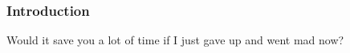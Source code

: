 \begin{frame}
  \frametitle{Introduction}
  Would it save you a lot of time if I just gave up and went mad now?
\end{frame}

